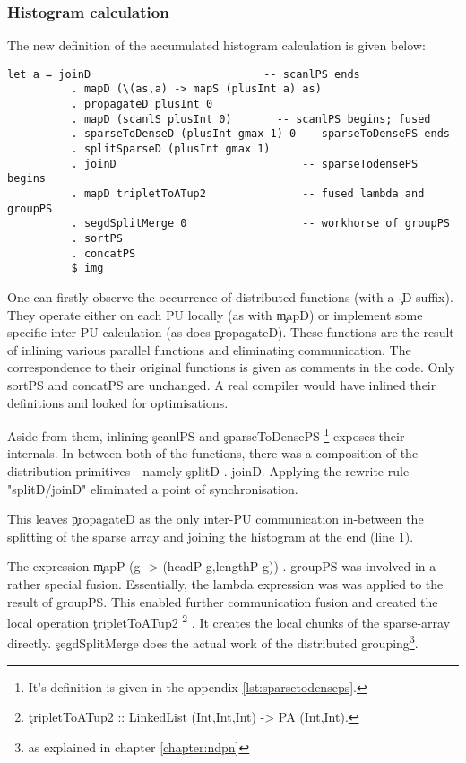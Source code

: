     \subsubsection{Histogram calculation}
      The new definition of the accumulated histogram calculation is given below:
      \begin{lstlisting}
let a = joinD                           -- scanlPS ends
          . mapD (\(as,a) -> mapS (plusInt a) as)
          . propagateD plusInt 0
          . mapD (scanlS plusInt 0)       -- scanlPS begins; fused
          . sparseToDenseD (plusInt gmax 1) 0 -- sparseToDensePS ends
          . splitSparseD (plusInt gmax 1)     
          . joinD                             -- sparseTodensePS begins
          . mapD tripletToATup2               -- fused lambda and groupPS 
          . segdSplitMerge 0                  -- workhorse of groupPS
          . sortPS
          . concatPS
          $ img
      \end{lstlisting}
      One can firstly observe the occurrence of distributed functions (with a \c{-D} suffix). They operate either
      on each PU locally (as with \c{mapD}) or implement some specific inter-PU calculation (as does \c{propagateD}).
      These functions are the result of inlining various parallel functions and eliminating communication.
      The correspondence to their original functions is given as comments in the code. Only sortPS and concatPS
      are unchanged. A real compiler would have inlined their definitions and looked for optimisations.      
      
      Aside from them, inlining \c{scanlPS} and \c{sparseToDensePS}
      \footnote{It's definition is given in the appendix \ref{lst:sparsetodenseps}.} exposes their internals.
      In-between both of the functions, there was a composition of the distribution primitives - namely \c{splitD . joinD}.
      Applying the rewrite rule "splitD/joinD" eliminated a point of synchronisation.
      
      This leaves \c{propagateD} as the only inter-PU communication in-between the splitting of the
      sparse array and joining the histogram at the end (line 1).
      
      The expression \c{mapP (\lam g -> (headP g,lengthP g)) . groupPS}
      was involved in a rather special fusion. Essentially, the lambda expression was
      was applied to the result of groupPS. This enabled further communication
      fusion and created the local operation \c{tripletToATup2}
      \footnote{\c{tripletToATup2 :: LinkedList (Int,Int,Int) -> PA (Int,Int)}.}
      . It creates the
      local chunks of the sparse-array directly. \c{segdSplitMerge} does the
      actual work of the distributed grouping\footnote{as explained in chapter \ref{chapter:ndpn}}.
      
